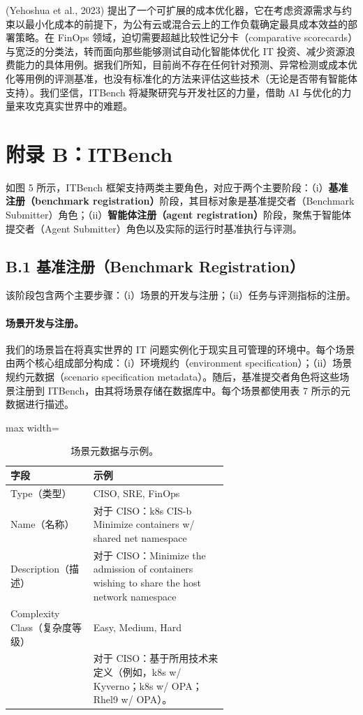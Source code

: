 \documentclass[10pt,UTF8,fontset=fandol]{ctexart}
\begin{document}
(Yehoshua et al., 2023) 提出了一个可扩展的成本优化器，它在考虑资源需求与约束以最小化成本的前提下，为公有云或混合云上的工作负载确定最具成本效益的部署策略。在 FinOps 领域，迫切需要超越比较性记分卡（comparative scorecards）与宽泛的分类法，转而面向那些能够测试自动化智能体优化 IT 投资、减少资源浪费能力的具体用例。据我们所知，目前尚不存在任何针对预测、异常检测或成本优化等用例的评测基准，也没有标准化的方法来评估这些技术（无论是否带有智能体支持）。我们坚信，ITBench 将凝聚研究与开发社区的力量，借助 AI 与优化的力量来攻克真实世界中的难题。

\section{附录 B：ITBench}

如图 5 所示，ITBench 框架支持两类主要角色，对应于两个主要阶段：（i）\textbf{基准注册（benchmark registration）}阶段，其目标对象是基准提交者（Benchmark Submitter）角色；（ii）\textbf{智能体注册（agent registration）}阶段，聚焦于智能体提交者（Agent Submitter）角色以及实际的运行时基准执行与评测。

\subsection{B.1 基准注册（Benchmark Registration）}

该阶段包含两个主要步骤：（i）场景的开发与注册；（ii）任务与评测指标的注册。

\paragraph{场景开发与注册。}
我们的场景旨在将真实世界的 IT 问题实例化于现实且可管理的环境中。每个场景由两个核心组成部分构成：（i）环境规约（environment specification）；（ii）场景规约元数据（scenario specification metadata）。随后，基准提交者角色将这些场景注册到 ITBench，由其将场景存储在数据库中。每个场景都使用表 7 所示的元数据进行描述。

\begin{table}[H]
\centering
\caption{场景元数据与示例。}
\label{tab:7}
\begin{adjustbox}{max width=\linewidth}
\begin{tabular}{@{}lp{0.62\linewidth}@{}}
\toprule
\textbf{字段} & \textbf{示例} \\
\midrule
Type（类型） & CISO, SRE, FinOps \\
Name（名称） & 对于 CISO：k8s CIS-b Minimize containers w/ shared net namespace \\
Description（描述） & 对于 CISO：Minimize the admission of containers wishing to share the host network namespace \\
Complexity Class（复杂度等级） & Easy, Medium, Hard \\
 & 对于 CISO：基于所用技术来定义（例如，k8s w/ Kyverno；k8s w/ OPA；Rhel9 w/ OPA）。\\
\bottomrule
\end{tabular}
\end{adjustbox}
\end{table}
\end{document}

